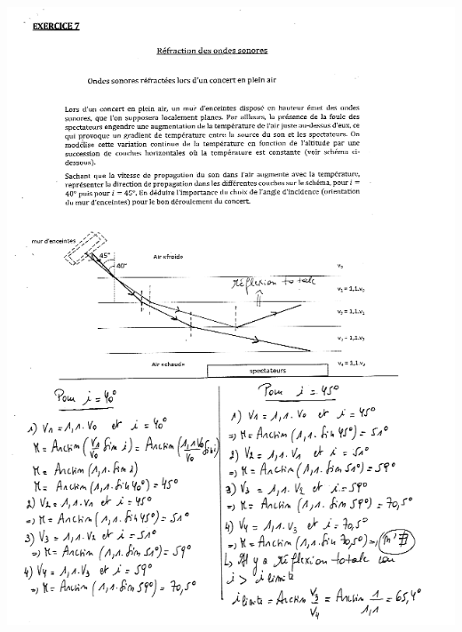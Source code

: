 \includegraphics[width=18.501cm,height=25.527cm]{Pictures/1000000100000278000003689DDE3826ADE887B9.png}
